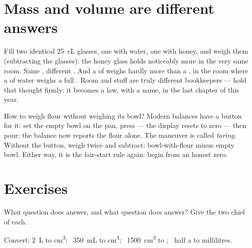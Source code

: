 \section{Mass and volume are different answers}

\begin{example}\label{ex:g6:mass-and-volume:different}
Fill two identical \qty{25}{cL} glasses, one with water, one with
honey, and weigh them (subtracting the glasses): the honey glass
holds noticeably more  in the very same room. Same ,
different . And a  of  weighs hardly more than a ,
in the room where a  of water weighs a full . Room
and stuff are truly different bookkeepers --- hold that thought
firmly: it becomes a law, with a name, in the last chapter of this
year.
\end{example}

\begin{remark}\label{rem:g6:mass-and-volume:tare}
How to weigh flour without weighing its bowl? Modern balances have
a button for it: set the empty bowl on the pan, press --- the
display resets to zero --- then pour: the balance now reports the
flour alone. The maneuver is called \emph{taring}. Without the
button, weigh twice and subtract: bowl-with-flour minus empty
bowl. Either way, it is the fair-start rule again: begin from an
honest zero.
\end{remark}

\section{Exercises}

\begin{exercise}[$\star$]\label{exo:g6:mass-and-volume:1}
What question does  answer, and what question does 
answer? Give the two chief  of each.
\end{exercise}

\begin{exercise}[$\star$]\label{exo:g6:mass-and-volume:2}
Convert: \qty{2}{L} to \unit{cm^3}; \ \qty{350}{mL} to
\unit{cm^3}; \ \qty{1500}{cm^3} to ; \ half a  to
millilitres.
\end{exercise}

